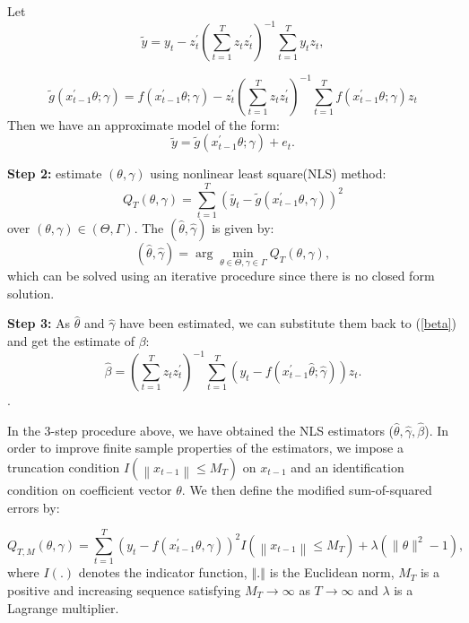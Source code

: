 \documentclass[a4paper,12pt,times,numbered,print,index]{report}
\numberwithin{equation}{section}
\begin{document}
Let  
$$\tilde{y} = y_t -  z_t^{\prime}  \left( \sum_{t=1}^{T}z_t z_t^{\prime}\right)^{-1} \sum_{t=1}^{T}y_t z_t, $$ 

$$\tilde{g} ( x_{t-1}^{\prime }\theta; \gamma) = f\left( x_{t-1}^{\prime }\theta; \gamma\right) - z_t^{\prime} \left( \sum_{t=1}^{T}z_t z_t^{\prime}\right)^{-1} \sum_{t=1}^{T} f\left( x_{t-1}^{\prime }\theta; \gamma\right) z_t$$ 
Then we have an approximate model of the form:
\begin{equation}
\tilde{y} = \tilde{g}\left( x_{t-1}^{\prime }\theta; \gamma\right) + e_t.
\label{trans_model}
\end{equation}

\textbf{Step 2: } estimate $(\theta, \gamma)$ using nonlinear least square(NLS) method:
$$
Q_{T}(\theta, \gamma)=\sum_{t=1}^{T}\left(\tilde{y_{t}}-\tilde{g}\left(x_{t-1}^{\prime} \theta, \gamma\right)\right)^{2}
$$
over $(\theta, \gamma) \in (\Theta, \Gamma)$.
The $(\hat{\theta}, \hat{\gamma})$ is given by:
\begin{equation*}
\left( \widehat{\theta},\widehat{\gamma}\right) =\arg \min_{\theta \in \Theta
	,\gamma \in \Gamma }Q_{T}\left( \theta ,\gamma \right),  \label{nls_c3}
\end{equation*}%
which can be solved using an iterative procedure since there is no closed form solution. 

\textbf{Step 3: } As $\hat{\theta}$ and $\hat{\gamma}$ have been estimated, we can substitute them back to (\ref{beta}) and get the estimate of $\beta$:
$$
 \hat{\beta} = \left( \sum_{t=1}^{T}z_t z_t^{\prime}\right)^{-1}\sum_{t=1}^{T}\left( y_t- f\left( x_{t-1}^{\prime }\hat{\theta}; \hat{\gamma}\right)\right) z_t.
$$.

In the 3-step procedure above, we have obtained the NLS estimators ($\widehat{\theta}, \widehat{\gamma}, \widehat{\beta}$). In order to improve finite sample properties of the estimators, we impose a truncation condition $I\left(\left\|x_{t-1}\right\| \leq M_T\right)$ on $x_{t-1}$ and an identification condition on coefficient vector $\theta$. We then define the modified sum-of-squared errors by:

$$
Q_{T, M}(\theta, \gamma)=\sum_{t=1}^{T}\left(y_{t}-f\left(x_{t-1}^{\prime} \theta, \gamma\right)\right)^{2} I\left(\left\|x_{t-1}\right\| \leq M_{T}\right)+\lambda\left(\|\theta\|^{2}-1\right),
$$
where $I\left( .\right) $ denotes the indicator function, $%
\left\Vert .\right\Vert $ is the Euclidean norm, $M_T$ is a positive and increasing sequence satisfying $ M_{T}\rightarrow \infty $ as $T \rightarrow \infty $ and $\lambda $ is a Lagrange
multiplier. 
\end{document}
